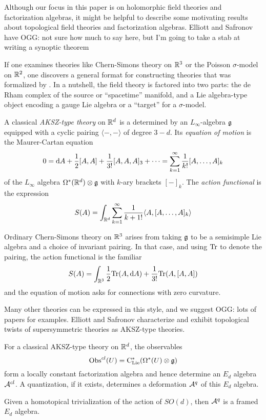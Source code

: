 \documentclass[11pt]{amsart}
\def\owen#1{{\textcolor{green!65!black}{OGG: {#1}}}}
\begin{document}
Although our focus in this paper is on holomorphic field theories and factorization algebras,
it might be helpful to describe some motivating results about topological field theories and factorization algebras.
Elliott and Safronov have \owen{not sure how much to say here, but I'm going to take a stab at writing a synoptic theorem}

If one examines theories like Chern-Simons theory on $\mathbb R^3$ or the Poisson $\sigma$-model on $\mathbb R^2$, 
one discovers a general format for constructing theories that was formalized by \cite{AKSZ}.
In a nutshell, the field theory is factored into two parts: 
the de Rham complex of the source or ``spacetime'' manifold, 
and a Lie algebra-type object encoding a gauge Lie algebra or a ``target'' for a $\sigma$-model.

\begin{dfn}
A classical {\em AKSZ-type theory} on $\mathbb R^d$ is a determined by an $L_\infty$-algebra $\mathfrak g$ equipped with a cyclic pairing $\langle-,-\rangle$ of degree $3-d$.
Its {\em equation of motion} is the Maurer-Cartan equation 
\[
0 = {\rm d} A + \frac{1}{2} [A,A] + \frac{1}{3!}[A,A,A]_3 + \cdots = \sum_{k=1}^\infty \frac{1}{k!} [A, \ldots, A]_k
\]
of the $L_\infty$ algebra $\Omega^*(\mathbb R^d) \otimes \mathfrak g$ with $k$-ary brackets $[-]_k$.
The {\em action functional} is the expression
\[
S(A) = \int_{\mathbb R^d} \sum_{k=1}^\infty \frac{1}{{k+1}!} \langle A, [A, \ldots, A]_k \rangle
\]
\end{dfn}

Ordinary Chern-Simons theory on $\mathbb R^3$ arises from taking $\mathfrak g$ to be a semisimple Lie algebra and a choice of invariant pairing.
In that case, and using ${\rm Tr}$ to denote the pairing, the action functional is the familiar
\[
S(A) = \int_{\mathbb R^3}  \frac{1}{2}{\rm Tr} ( A, {\rm d} A ) + \frac{1}{3!} {\rm Tr}( A, [A, A])
\]
and the equation of motion asks for connections with zero curvature.

Many other theories can be expressed in this style, and we suggest \owen{lots of papers} for examples.
Elliott and Safronov characterize and exhibit topological twists of supersymmetric theories as AKSZ-type theories.

\begin{thm}
For a classical AKSZ-type theory on $\mathbb R^d$, the observables 
\[
{\rm Obs}^{cl}(U) = {\rm C}_{{\rm Lie}}^*(\Omega^*(U) \otimes \mathfrak g)
\]
form a locally constant factorization algebra and hence determine an $E_d$ algebra~$\mathcal A^{cl}$.
A quantization, if it exists, determines a deformation $\mathcal A^q$ of this $E_d$ algebra.

Given a homotopical trivialization of the action of $SO(d)$, then $\mathcal A^q$ is a framed $E_d$ algebra.
\end{thm}
\end{document}
